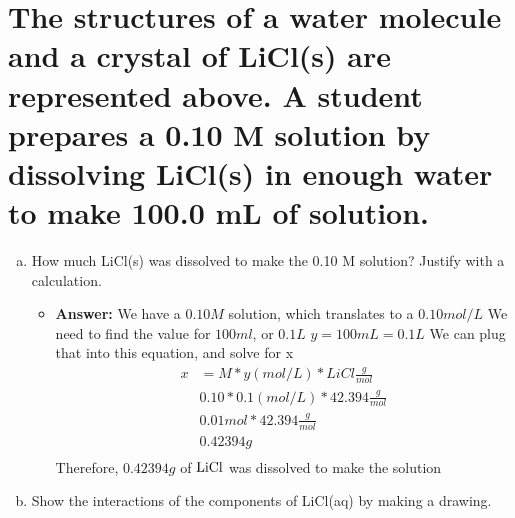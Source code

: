 \documentclass[11pt]{article}
\begin{document}
\section{The structures of a water molecule and a crystal of LiCl(s) are represented above. A student prepares a 0.10 M solution by dissolving LiCl(s) in enough water to make 100.0 mL of solution.}
\label{sec:org7c71885}
\begin{enumerate}[(a)]
\item How much LiCl(s) was dissolved to make the 0.10 M solution? Justify with a
calculation.
\begin{itemize}
\item \textbf{Answer:} We have a \(0.10M\) solution, which translates to  a \(0.10mol/L\)
We need to find the value for \(100ml\), or \(0.1L\)
\(y = 100mL = 0.1L\)
We can plug that into this equation, and solve for x
\begin{align*}
x&= M * y(mol/L) * LiCl\frac{g}{mol}\\
&0.10 * 0.1(mol/L) * 42.394\frac{g}{mol}\\
&0.01mol * 42.394\frac{g}{mol}\\
&0.42394g\\
\end{align*}
Therefore, \(0.42394g\) of \(\ce{LiCl}\) was dissolved to make the solution
\end{itemize}

\item Show the interactions of the components of LiCl(aq) by making a drawing.
\end{enumerate}
\end{document}
